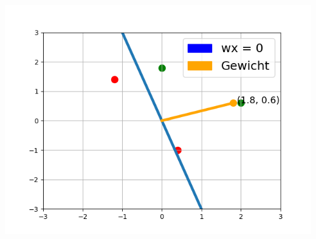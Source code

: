 \documentclass[a4paper]{scrartcl}
\newenvironment{Figure}
  {\par\medskip\noindent\minipage{\linewidth}}
  {\endminipage\par\medskip}
\begin{document}
\begin{multicols}{2}
                        \begin{Figure}
                            \centering
                            \includegraphics[width=\linewidth]{bsp2.png}
                        \end{Figure}


\end{multicols}
\end{document}
